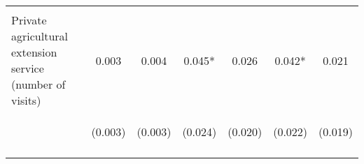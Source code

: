 \begin{center}
\begin{tabular}{lcccccc}
\vspace{4pt} & \begin{footnotesize}[0.354]\end{footnotesize} & \begin{footnotesize}[0.355]\end{footnotesize} & \begin{footnotesize}[0.149]\end{footnotesize} & \begin{footnotesize}[0.162]\end{footnotesize} & \begin{footnotesize}[0.104]\end{footnotesize} & \begin{footnotesize}[0.106]\end{footnotesize} \\
Private agricultural extension service (number of visits) & 0.003 & 0.004 & 0.045* & 0.026 & 0.042* & 0.021 \\
 & \begin{footnotesize}(0.003)\end{footnotesize} & \begin{footnotesize}(0.003)\end{footnotesize} & \begin{footnotesize}(0.024)\end{footnotesize} & \begin{footnotesize}(0.020)\end{footnotesize} & \begin{footnotesize}(0.022)\end{footnotesize} & \begin{footnotesize}(0.019)\end{footnotesize} \\
\vspace{4pt} & \begin{footnotesize}[0.318]\end{footnotesize} & \begin{footnotesize}[0.153]\end{footnotesize} & \begin{footnotesize}[0.059]\end{footnotesize} & \begin{footnotesize}[0.199]\end{footnotesize} & \begin{footnotesize}[0.055]\end{footnotesize} & \begin{footnotesize}[0.266]\end{footnotesize} \\

\end{tabular}
\end{center}
